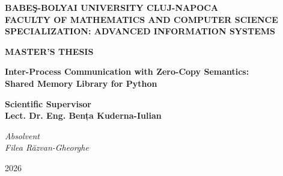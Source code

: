 \documentclass[12pt]{report}
\begin{document}
\begingroup{}
\begin{titlepage}
\begin{center}
{\Large\textbf{BABEŞ-BOLYAI UNIVERSITY CLUJ-NAPOCA}\\[1em]
\textbf{FACULTY OF MATHEMATICS AND COMPUTER SCIENCE}\\[1em]
\textbf{SPECIALIZATION: ADVANCED INFORMATION SYSTEMS}}
\end{center}

\vspace{8em}

\begin{center}
    \Huge\textbf{MASTER'S THESIS}
\end{center}

\vspace{2em}

\begin{center}
    \Large\textbf{Inter-Process Communication with Zero-Copy Semantics:\\[0.5em] Shared Memory Library for Python}
\end{center}

\vspace{9em}

\begin{flushleft}
{\Large\textbf{Scientific Supervisor \\ Lect. Dr. Eng. Bența Kuderna-Iulian}}
\end{flushleft}

\vspace{3em}

\begin{flushright}
{\Large\textit{Absolvent\\ Filea Răzvan-Gheorghe}}
\end{flushright}

\vfill

\begin{center}
{\Large{2026}}
\end{center}
\end{titlepage}
\end{document}
